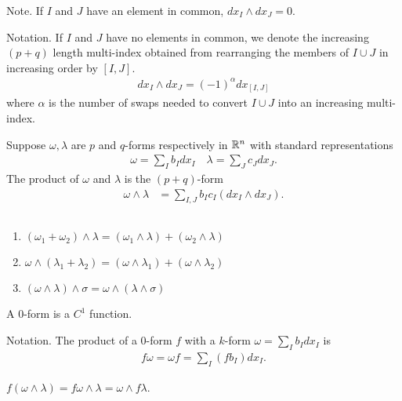 \documentclass[11pt]{article}
\begin{document}
Note. If $I$ and $J$ have an element in common, $dx_I \wedge dx_J = 0$.

Notation. If $I$ and $J$ have no elements in common, we denote the increasing $(p + q)$ length multi-index obtained from rearranging the members of $I \cup J$ in increasing order by $[I, J]$. \begin{align*} dx_I \wedge dx_J = (-1)^{\alpha} dx_{[I, J]}
\end{align*} where $\alpha$ is the number of swaps needed to convert $I \cup J$ into an increasing multi-index.

Suppose $\omega, \lambda$ are $p$ and $q$-forms respectively in $\mathbb{R}^n$ with standard representations \begin{align*} \omega = \sum_I b_I dx_I \quad \lambda = \sum_J c_J dx_J.
\end{align*} The product of $\omega$ and $\lambda$ is the $(p + q)$-form \begin{align*} \omega \wedge \lambda & = \sum_{I, J} b_I c_I (dx_I \wedge dx_J).
\end{align*}

\begin{remark} $\text{}$ \begin{enumerate}
  \item $(\omega_1 + \omega_2) \wedge \lambda = (\omega_1 \wedge \lambda) + (\omega_2 \wedge \lambda)$
  \item $\omega \wedge (\lambda_1 + \lambda_2) = (\omega \wedge \lambda_1) + (\omega \wedge \lambda_2)$
    \item $(\omega \wedge \lambda) \wedge \sigma = \omega \wedge (\lambda \wedge \sigma)$
  \end{enumerate}
\end{remark}

\begin{definition} A $0$-form is a $C^1$ function.
\end{definition}

Notation. The product of a $0$-form $f$ with a $k$-form $\omega = \sum_I b_I dx_I$ is \begin{align*} f \omega = \omega f = \sum_I (fb_I) dx_I.
\end{align*}

\begin{remark} $f ( \omega \wedge \lambda) = f \omega \wedge \lambda = \omega \wedge f \lambda $.
\end{remark}
\end{document}
